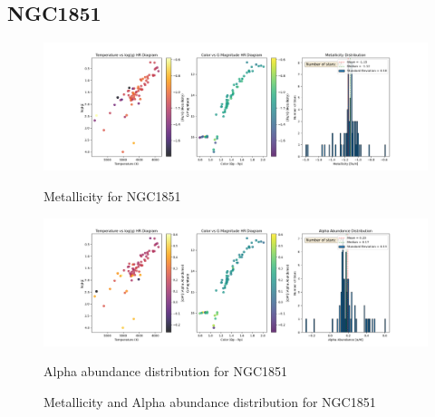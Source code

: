 \documentclass[a4paper,12pt]{article}
\begin{document}
\subsection{NGC1851}
\begin{figure}[H]
    \centering
    \begin{minipage}[b]{0.8\textwidth}
        \centering
        \includegraphics[width=\textwidth]{NGC1851_metalicity.png}
        \caption{Metallicity for NGC1851}
        \label{fig:NGC1851_metalicity}
    \end{minipage}
    \hfill
    \begin{minipage}[b]{0.8\textwidth}
        \centering
        \includegraphics[width=\textwidth]{NGC1851_alpha.png}
        \caption{Alpha abundance distribution for NGC1851}
        \label{fig:NGC1851_alpha}
    \end{minipage}
    \caption{Metallicity and Alpha abundance distribution for NGC1851}
    \label{fig:NGC1851_combined}
\end{figure}
\clearpage
\end{document}
